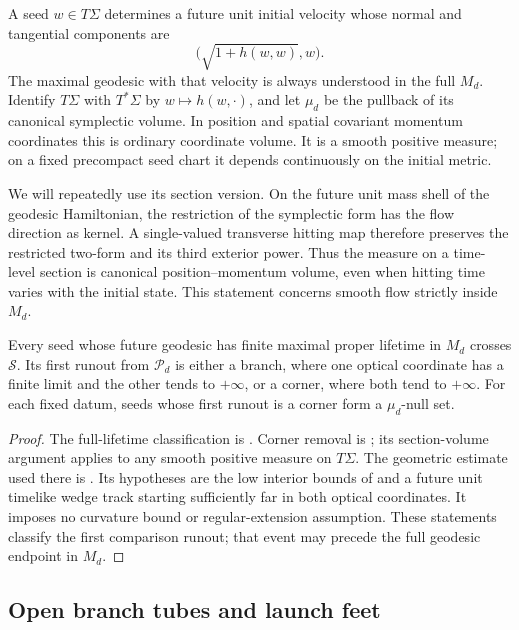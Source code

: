 A seed $w\in T\Sigma$ determines a future unit initial velocity
whose normal and tangential components are
\[
 \bigl(\sqrt{1+h(w,w)},w\bigr).
\]
The maximal geodesic with that velocity is always understood in
the full $M_d$. Identify $T\Sigma$ with $T^*\Sigma$ by
$w\mapsto h(w,\cdot)$, and let $\mu_d$ be the pullback of its
canonical symplectic volume. In position and spatial covariant
momentum coordinates this is ordinary coordinate volume. It is
a smooth positive measure; on a fixed precompact seed chart it
depends continuously on the initial metric.

We will repeatedly use its section version. On the future unit
mass shell of the geodesic Hamiltonian, the restriction of the
symplectic form has the flow direction as kernel. A
single-valued transverse hitting map therefore preserves the
restricted two-form and its third exterior power. Thus the
measure on a time-level section is canonical position--momentum
volume, even when hitting time varies with the initial state.
This statement concerns smooth flow strictly inside $M_d$.

\begin{proposition}
\label{prop:bg-runout}
Every seed whose future geodesic has finite maximal proper
lifetime in $M_d$ crosses $\mathcal S$. Its first runout from
$\mathcal P_d$ is either a branch, where one optical coordinate
has a finite limit and the other tends to $+\infty$, or a corner,
where both tend to $+\infty$. For each fixed datum, seeds whose
first runout is a corner form a $\mu_d$-null set.
\end{proposition}

\begin{proof}
The full-lifetime classification is
\cite[]{KerrCTwo}. Corner removal is
\cite[]{KerrCOne}; its section-volume argument
applies to any smooth positive measure on $T\Sigma$.
The geometric estimate used there is
\cite[]{KerrCTwo}. Its hypotheses are the low interior
bounds of  and a future unit timelike wedge
track starting sufficiently far in both optical coordinates.
It imposes no curvature bound or regular-extension assumption.
These statements classify the first comparison runout; that
event may precede the full geodesic endpoint in $M_d$.
\end{proof}

\subsection{Open branch tubes and launch feet}

